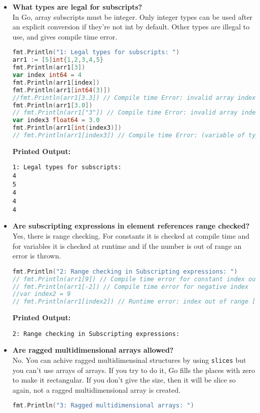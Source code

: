 \documentclass{article}
\begin{document}
\begin{itemize}
\item \textbf{What types are legal for subscripts?} \\
 In Go, array subscripts must be integer. Only integer types can be used after an explicit conversion if they’re not int by default. Other types are illegal to use, and gives compile time error. 
\begin{lstlisting}[language=Go]
fmt.Println("1: Legal types for subscripts: ")
arr1 := [5]int{1,2,3,4,5}
fmt.Println(arr1[3])
var index int64 = 4
fmt.Println(arr1[index])
fmt.Println(arr1[int64(3)]) 
//fmt.Println(arr1[3.3]) // Compile time Error: invalid array index 3.3 (type float64)
fmt.Println(arr1[3.0])
// fmt.Println(arr1["3"]) // Compile time Error: invalid array index "3" (type string)
var index3 float64 = 3.0
fmt.Println(arr1[int(index3)])
// fmt.Println(arr1[index3]) // Compile time Error: (variable of type float64) must be integer
\end{lstlisting}
\textbf{Printed Output:}
\begin{verbatim}
1: Legal types for subscripts: 
4
5
4
4
4
\end{verbatim}


\item \textbf{Are subscripting expressions in element references range checked?} \\	
Yes, there is range checking. For constants it is checked at compile time and for variables it is checked at runtime and if the number is out of range an error is thrown. \begin{lstlisting}[language=Go]
fmt.Println("2: Range checking in Subscripting expressions: ")
// fmt.Println(arr1[9]) // Compile time error for constant index out of range
// fmt.Println(arr1[-2]) // Compile time error for negative index
//var index2 = 9
// fmt.Println(arr1[index2]) // Runtime error: index out of range [9] with length 5
\end{lstlisting}
\textbf{Printed Output:}
\begin{verbatim}
2: Range checking in Subscripting expressions: 
\end{verbatim}


\item \textbf{Are ragged multidimensional arrays allowed?} \\
No. You can achive ragged multidimensinal structures by using \texttt{slices} but you can't use arrays of arrays. If you try to do it, Go fills the places with zero to make it rectangular. If you don't give the size, then it will be slice so again, not a ragged multidimensional array is created.
\begin{lstlisting}[language=GO]
fmt.Println("3: Ragged multidimensional arrays: ")


\end{lstlisting}
\end{itemize}
\end{document}
